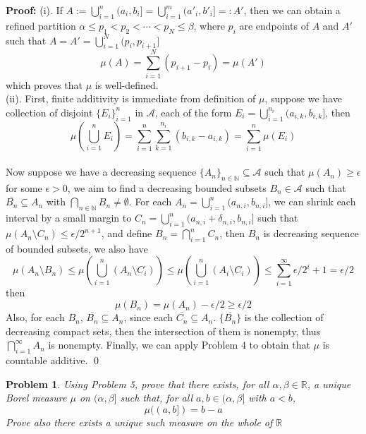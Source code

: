 \documentclass[12pt]{article}
\newtheorem{problem}{Problem}
\begin{document}
\textbf{Proof:} (i). If $A:=\bigcup\limits_{i=1}^n(a_i, b_i]=\bigcup_{i=1}^m(a'_i, b'_i]=: A'$, then we can obtain a refined partition $\alpha\leq p_1<p_2<\cdots<p_N\leq \beta$, where $p_i$ are endpoints of $A$ and $A'$ such that $A=A'=\bigcup\limits_{i=1}^N(p_i,p_{i+1}]$
$$
    \mu(A)=\sum\limits_{i=1}^N(p_{i+1}-p_{i})=\mu(A')
$$
which proves that $\mu$ is well-defined. \\
\indent (ii). First, finite additivity is immediate from definition of $\mu$, suppose we have collection of disjoint $\{E_i\}_{i=1}^n$ in $\mathcal{A}$, each of the form $E_i=\bigcup\limits_{i=1}^{n_i}(a_{i, k}, b_{i, k}]$, then 
$$
    \mu\left(\bigcup_{i=1}^n E_i\right)=\sum\limits_{i=1}^n\sum\limits_{k=1}^{n_i}(b_{i,k}-a_{i,k})=\sum\limits_{i=1}^n\mu(E_i)
$$
\\
\indent Now suppose we have a decreasing sequence $\{A_n\}_{n\in\mathbb{N}}\subseteq\mathcal{A}$ such that $\mu(A_n)\geq\epsilon$ for some $\epsilon>0$, we aim to find a decreasing bounded subsets $B_n\in\mathcal{A}$ such that $\overline{B_n}\subseteq A_n$ with $\bigcap_{n\in\mathbb{N}}B_n\neq\emptyset$. For each $A_n=\bigcup\limits_{i=1}^n(a_{n,i}, b_{n, i}]$, we can shrink each interval by a small margin to $C_n=\bigcup\limits_{i=1}^n(a_{n,i}+\delta_{n,i},b_{n,i}]$ such that $\mu(A_n\setminus C_n)\leq \epsilon/2^{n+1}$, and define $B_n=\bigcap\limits_{i=1}^n C_n$, then $B_n$ is decreasing sequence of bounded subsets, we also have 
$$
    \mu(A_n\setminus B_n)\leq \mu\left(\bigcup_{i=1}^n(A_n\setminus C_i)\right)\leq \mu\left(\bigcup_{i=1}^n(A_i\setminus C_i)\right)\leq \sum\limits_{i=1}^\infty \epsilon/2^i+1=\epsilon/2
$$
then 
$$
    \mu(B_n)=\mu(A_n)-\epsilon/2\geq \epsilon/2
$$
Also, for each $B_n$, $\overline{B_n}\subseteq A_n$, since each $\overline{C_n}\subseteq A_n$. $\{\overline{B_n}\}$ is the collection of decreasing compact sets, then the intersection of them is nonempty, thus $\bigcap\limits_{i=1}^\infty A_n$ is nonempty. Finally, we can apply Problem 4 to obtain that $\mu$ is countable additive. \qed  
\\
\begin{problem}
    Using Problem 5, prove that there exists, for all $\alpha, \beta\in\mathbb{R}$, a unique Borel measure $\mu$ on $(\alpha,\beta]$ such that, for all $a,b\in (\alpha, \beta]$ with $a<b$, 
    $$
        \mu((a,b])=b-a
    $$
    Prove also there exists a unique such measure on the whole of $\mathbb{R}$
\end{problem}
\end{document}
